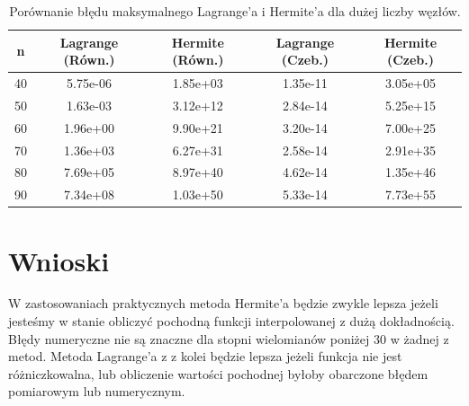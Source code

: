 \documentclass{article}
\begin{document}
\begin{table}[H]
\centering

\begin{tabular}{ccccc}
\toprule
\textbf{n} & \textbf{Lagrange (Równ.)} & \textbf{Hermite (Równ.)} & \textbf{Lagrange (Czeb.)} & \textbf{Hermite (Czeb.)} \\ \midrule
40 & 5.75e-06 & 1.85e+03 & 1.35e-11 & 3.05e+05 \\
50 & 1.63e-03 & 3.12e+12 & 2.84e-14 & 5.25e+15 \\
60 & 1.96e+00 & 9.90e+21 & 3.20e-14 & 7.00e+25 \\
70 & 1.36e+03 & 6.27e+31 & 2.58e-14 & 2.91e+35 \\
80 & 7.69e+05 & 8.97e+40 & 4.62e-14 & 1.35e+46 \\
90 & 7.34e+08 & 1.03e+50 & 5.33e-14 & 7.73e+55 \\ \bottomrule
\end{tabular}


\caption{Porównanie błędu maksymalnego Lagrange'a i Hermite'a dla dużej liczby węzłów.}

\label{tab:high_n_comparison}
\end{table}

\section{Wnioski}
W zastosowaniach praktycznych metoda Hermite'a będzie zwykle lepsza jeżeli jesteśmy w stanie obliczyć pochodną funkcji interpolowanej z dużą dokładnością. 
Błędy numeryczne nie są znaczne dla stopni wielomianów poniżej 30 w żadnej z metod. Metoda Lagrange'a z z kolei będzie lepsza jeżeli funkcja
nie jest różniczkowalna, lub obliczenie wartości pochodnej byłoby obarczone błędem pomiarowym lub numerycznym.
\end{document}
